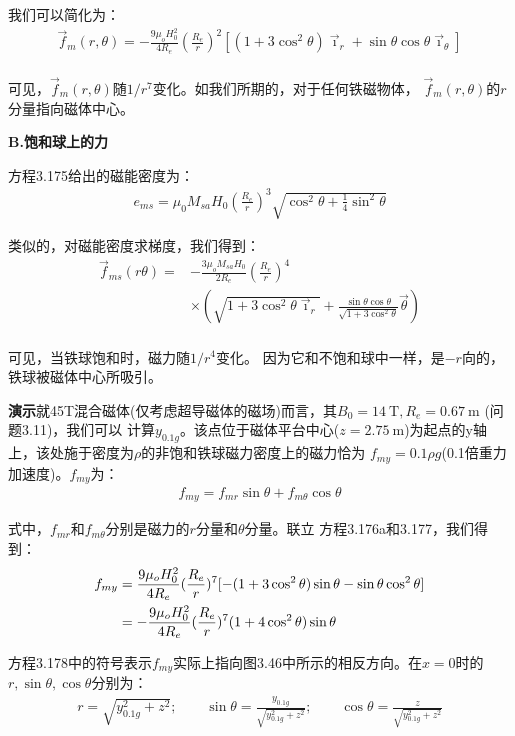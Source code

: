 我们可以简化为：
\begin{align}
\vec{f}_{m}(r,\theta)=-\frac{9\mu_{o}H_{0}^{2}}{4R_{e}}(\frac{R_{e}}{r})^{2}[(1+3\cos^{2}\theta)\vec{\imath}_{r}+\sin\theta\cos\theta\vec{\imath}_{\theta}]\\%
\end{align}

可见，$\vec{f}_{m}(r,\theta)$随$1/r^7$变化。如我们所期的，对于任何铁磁物体，
$\vec{f}_{m}(r,\theta)$的$r$分量指向磁体中心。

\textbf{B.饱和球上的力}

方程3.175给出的磁能密度为：
\begin{align*}
e_{ms}=\mu_0 M_{sa}H_0(\frac{R_e}{r})^3\sqrt{\cos^2\theta+\frac{1}{4}\sin^2\theta}
\end{align*}

类似的，对磁能密度求梯度，我们得到：
\begin{align*}
\vec{f}_{ms}(r\theta)=&-\frac{3\mu_{o}M_{sa}H_{0}}{2R_{e}}(\frac{R_{e}}{r})^{4}\\
&\times(\sqrt{1+3\cos^{2}\theta\vec{\imath}_{r}}+\frac{\sin\theta\cos\theta}{\sqrt{1+3\cos^{2}\theta}}\vec{\theta})\\\tag{3.176b}
\end{align*}

可见，当铁球饱和时，磁力随$1/r^4$变化。
因为它和不饱和球中一样，是$-r$向的，铁球被磁体中心所吸引。

\textbf{演示}\quad 就45T混合磁体(仅考虑超导磁体的磁场)而言，其$B_0 = 14\ \mathrm{T},R_e = 0.67\ \mathrm{m}$ (问题3.11)，我们可以
计算$y_{0.1g}$。该点位于磁体平台中心($z=2.75\ \mathrm{m}$)为起点的y轴上，该处施于密度为$\rho$的非饱和铁球磁力密度上的磁力恰为
$f_{my}=0.1\rho g$(0.1倍重力加速度)。$f_{my}$为：
\begin{align}
f_{my}=f_{mr}\sin\theta+f_{m\theta}\cos\theta%
\end{align}

式中，$f_{mr}$和$f_{m\theta}$分别是磁力的$r$分量和$\theta$分量。联立
方程3.176a和3.177，我们得到：
\begin{align}
f_{my}&=\frac{9\mu_{o}H_{0}^{2}}{4R_{e}}(\frac{R_{e}}{r})^{7}[-(1+3\cos^{2}\theta)\sin\theta-\sin\theta\cos^{2}\theta]\\
&=-\frac{9\mu_{o}H_{0}^{2}}{4R_{e}}(\frac{R_{e}}{r})^{7}(1+4\cos^{2}\theta)\sin\theta\notag
\end{align}

方程3.178中的符号表示$f_{my}$实际上指向图3.46中所示的相反方向。在$x=0$时的$r,\sin\theta,\cos\theta$分别为：
\begin{align*}
r=\sqrt{y_{0.1g}^2+z^2};\qquad \sin\theta=\frac{y_{0.1g}}{\sqrt{y_{0.1g}^2+z^2}};\qquad \cos\theta=\frac{z}{\sqrt{y_{0.1g}^2+z^2}}
\end{align*}

